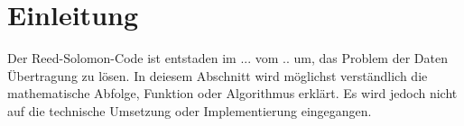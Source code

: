 %
%
%
\section{Einleitung
\label{reedsolomon:section:einleitung}}
Der Reed-Solomon-Code ist entstaden im ... vom .. um,
das Problem der Daten Übertragung zu lösen.
In deiesem Abschnitt wird möglichst verständlich die mathematische Abfolge, Funktion oder Algorithmus erklärt.
Es wird jedoch nicht auf die technische Umsetzung oder Implementierung eingegangen.



